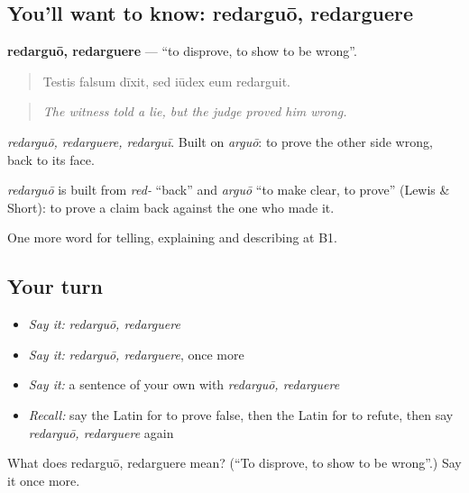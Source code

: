 \subsection*{You'll want to know: redarguō, redarguere}
\textbf{redarguō, redarguere} — \textquotedblleft{}to disprove, to show to be wrong\textquotedblright{}.

\begin{quote}
Testis falsum dīxit, sed iūdex eum redarguit.
\end{quote}

\begin{quote}
\emph{The witness told a lie, but the judge proved him wrong.}
\end{quote}

\emph{redarguō, redarguere, redarguī}. Built on \emph{arguō}: to prove the other side wrong, back to its face.

\begin{cousinweb}
\emph{redarguō} is built from \emph{red-} \textquotedblleft{}back\textquotedblright{} and \emph{arguō} \textquotedblleft{}to make clear, to prove\textquotedblright{} (Lewis \& Short): to prove a claim back against the one who made it.
\end{cousinweb}

\begin{grammarlens}[title={What you've built}]
One more word for telling, explaining and describing at B1.
\end{grammarlens}

\subsection*{Your turn}
\begin{itemize}
\raggedright
  \item \emph{Say it:} \emph{redarguō, redarguere}
  \item \emph{Say it:} \emph{redarguō, redarguere}, once more
  \item \emph{Say it:} a sentence of your own with \emph{redarguō, redarguere}
  \item \emph{Recall:} say the Latin for to prove false, then the Latin for to refute, then say \emph{redarguō, redarguere} again
\end{itemize}

\begin{tcolorbox}[breakable,colback=teal!4,colframe=teal!35!black,title={Before you move on}]
What does redarguō, redarguere mean? (\textquotedblleft{}To disprove, to show to be wrong\textquotedblright{}.) Say it once more.
\end{tcolorbox}
